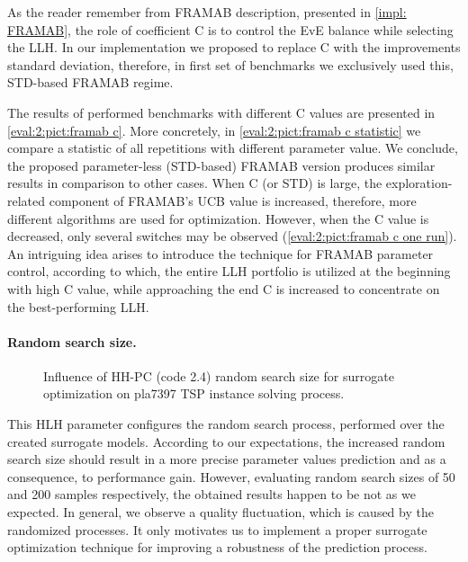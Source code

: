 As the reader remember from FRAMAB description, presented in \cref{impl: FRAMAB}, the role of coefficient C is to control the EvE balance while selecting the LLH. In our implementation we proposed to replace C with the improvements standard deviation, therefore, in first set of benchmarks we exclusively used this, STD-based FRAMAB regime.

The results of performed benchmarks with different C values are presented in \cref{eval:2:pict:framab c}. More concretely, in \cref{eval:2:pict:framab c statistic} we compare a statistic of all repetitions with different parameter value. We conclude, the proposed parameter-less (STD-based) FRAMAB version produces similar results in comparison to other cases. When C (or STD) is large, the exploration-related component of FRAMAB's UCB value is increased, therefore, more different algorithms are used for optimization. However, when the C value is decreased, only several switches may be observed (\cref{eval:2:pict:framab c one run}). An intriguing idea arises to introduce the technique for FRAMAB parameter control, according to which, the entire LLH portfolio is utilized at the beginning with high C value, while approaching the end C is increased to concentrate on the best-performing LLH.


\paragraph{Random search size.}
\begin{figure}[h]
	\centering
	\vspace{-10pt}
	
	\caption{Influence of HH-PC (code 2.4) random search size for surrogate optimization on pla7397 TSP instance solving process.}
	\vspace{-5pt}
	\label{eval:2:pict: random search size}
\end{figure}
This HLH parameter configures the random search process, performed over the created surrogate models. According to our expectations, the increased random search size should result in a more precise parameter values prediction and as a consequence, to performance gain. However, evaluating random search sizes of 50 and 200 samples respectively, the obtained results happen to be not as we expected. In general, we observe a quality fluctuation, which is caused by the randomized processes. It only motivates us to implement a proper surrogate optimization technique for improving a robustness of the prediction process.


